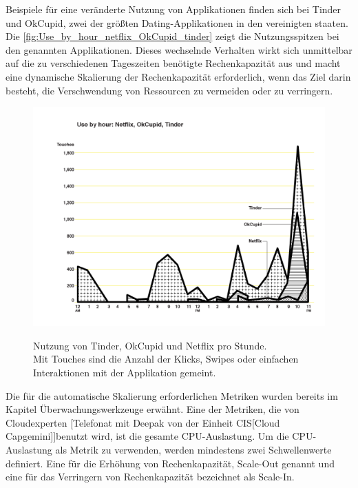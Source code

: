 {Beispiele für eine veränderte Nutzung von Applikationen finden sich bei Tinder und OkCupid, zwei der größten Dating-Applikationen in den vereinigten staaten. Die \autoref{fig:Use_by_hour_netflix_OkCupid_tinder} zeigt die Nutzungsspitzen bei den genannten Applikationen. Dieses wechselnde Verhalten wirkt sich unmittelbar auf die zu verschiedenen Tageszeiten benötigte Rechenkapazität aus und macht eine dynamische Skalierung der Rechenkapazität erforderlich, wenn das Ziel darin besteht, die Verschwendung von Ressourcen zu vermeiden oder zu verringern. 
\begin{figure}[h!]
  \centering
  \includegraphics[scale=0.4]{sources/Use_by_hour_netflix_OkCupid_tinder}
  \caption[Nutzung von Tinder, OkCupid und Netflix pro Stunde]{}\label{fig:Use_by_hour_netflix_OkCupid_tinder} Nutzung von Tinder, OkCupid und Netflix pro Stunde.  
  {\cite{SCOUT1}}
  \\Mit Touches sind die Anzahl der Klicks, Swipes oder einfachen Interaktionen mit der Applikation gemeint.
\end{figure}

Die für die automatische Skalierung erforderlichen Metriken wurden bereits im Kapitel Überwachungswerkzeuge erwähnt. Eine der Metriken, die von Cloudexperten [Telefonat mit Deepak von der Einheit CIS[Cloud Capgemini]]benutzt wird, ist die gesamte CPU-Auslastung. 
Um die CPU-Auslastung als Metrik zu verwenden, werden mindestens zwei Schwellenwerte definiert. Eine für die Erhöhung von Rechenkapazität, Scale-Out genannt und eine für das Verringern von Rechenkapazität bezeichnet als Scale-In.

}
